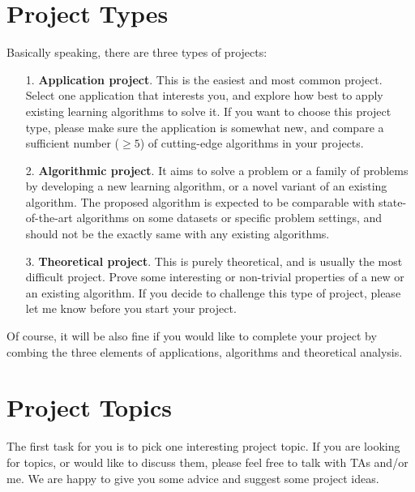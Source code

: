 \documentclass[10pt]{article}
\begin{document}
\section{Project Types}
Basically speaking, there are three types of projects:
\begin{itemize}
	\item[1.] \textbf{Application project}. This is the easiest and most common project. Select one application that
	      interests you, and explore how best to apply existing learning algorithms to solve it. If you want to choose this project type,
	      please make sure the application is somewhat new, and compare a sufficient number ($\geq 5$) of cutting-edge algorithms in your projects.
	\item[2.] \textbf{Algorithmic project}. It aims to solve a problem or a family of problems by developing a new learning algorithm, or a novel variant of an
	      existing algorithm. The proposed algorithm is expected to be comparable with state-of-the-art algorithms on some datasets or specific problem settings,
	      and should not be the exactly same with any existing algorithms.
	\item[3.] \textbf{Theoretical project}. This is purely theoretical, and is usually the most difficult project.
	      Prove some interesting or non-trivial properties of a new or an existing algorithm. If you decide to challenge this type of project,
	      please let me know before you start your project.
\end{itemize}
Of course, it will be also fine if you would like to complete your project by combing the three elements of applications, algorithms and theoretical analysis.


\section{Project Topics}
The first task for you is to pick one interesting project topic. If you are looking for topics, or would like to discuss them, please feel free to
talk with TAs and/or me. We are happy to give you some advice and suggest some project ideas.
\end{document}
